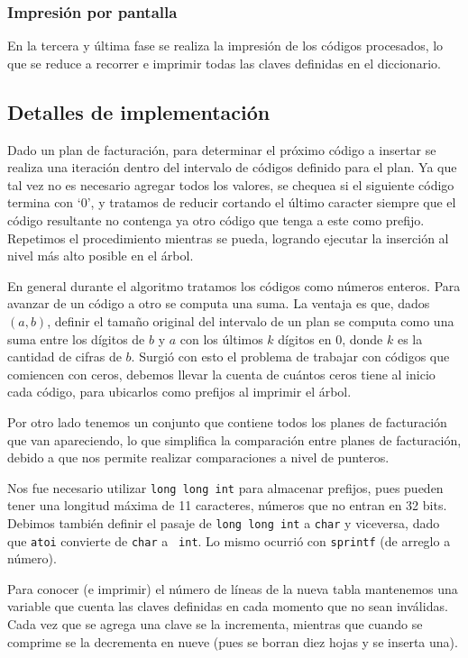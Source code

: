 \subsubsection*{Impresión por pantalla}

En la tercera y última fase se realiza la impresión de los códigos procesados,
lo que se reduce a recorrer e imprimir todas las claves definidas en el
diccionario.

\subsection*{Detalles de implementación}

Dado un plan de facturación, para determinar el próximo código a insertar
se realiza una iteración dentro del intervalo de códigos definido para el
plan. Ya que tal vez no es necesario agregar todos los valores, se chequea
si el siguiente código termina con `0', y tratamos de reducir cortando el
último caracter siempre que el código resultante no contenga ya otro
código que tenga a este como prefijo. Repetimos el procedimiento mientras
se pueda, logrando ejecutar la inserción al nivel más alto posible en el árbol.

En general durante el algoritmo tratamos los códigos como números
enteros. Para avanzar de un código a otro se computa una suma. La ventaja es
que, dados $(a,b)$, definir el tamaño original del intervalo de un plan se
computa como una suma entre los dígitos de $b$ y $a$ con los últimos $k$
dígitos en 0, donde $k$ es la cantidad de cifras de $b$. Surgió con esto
el problema de trabajar con códigos que comiencen con ceros, debemos llevar
la cuenta de cuántos ceros tiene al inicio cada código, para ubicarlos
como prefijos al imprimir el árbol.

Por otro lado tenemos un conjunto que contiene todos los planes de
facturación que van apareciendo, lo que simplifica la comparación entre
planes de facturación, debido a que nos permite realizar comparaciones a
nivel de punteros.

Nos fue necesario utilizar {\tt long long int} para almacenar prefijos,
pues pueden tener una longitud máxima de 11 caracteres, números que no
entran en 32 bits. Debimos también definir el pasaje de {\tt long long int}
a {\tt char} y viceversa, dado que {\tt atoi} convierte de {\tt char} a {\tt
int}. Lo mismo ocurrió con {\tt sprintf} (de arreglo a número).

Para conocer (e imprimir) el número de líneas de la nueva tabla mantenemos
una variable que cuenta las claves definidas en cada momento que no sean
inválidas. Cada vez que se agrega una clave se la incrementa, mientras que
cuando se comprime se la decrementa en nueve (pues se borran diez hojas y
se inserta una).

